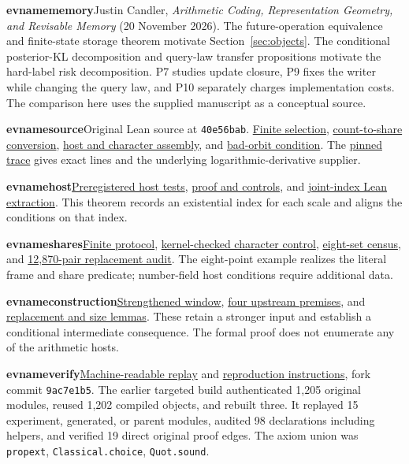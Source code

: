 \documentclass[11pt,letterpaper]{article}
\newcommand{\evitem}[2]{\par\medskip\noindent\hypertarget{ev-#1}{\textsf{\bfseries\color{teal}\csname evname#1\endcsname}}\quad #2\par}
\newcommand{\prooflink}[2]{\href{https://github.com/nousentllc/riemann-hypothesis/blob/9ac7e1b546b132edde02709e1c0af1bfccd40755/research/uriel/experiments/retained-host/#1}{#2}}
\newcommand{\origlink}[2]{\href{https://github.com/nousentllc/riemann-hypothesis/blob/40e56bab026552e089d7afcfeff08d2defb9c005/src/#1}{#2}}
\begin{document}
\evitem{memory}{Justin Candler, \emph{Arithmetic Coding, Representation Geometry, and Revisable Memory} (20 November 2026). The future-operation equivalence and finite-state storage theorem motivate Section~\ref{sec:objects}. The conditional posterior-KL decomposition and query-law transfer propositions motivate the hard-label risk decomposition. P7 studies update closure, P9 fixes the writer while changing the query law, and P10 separately charges implementation costs. The comparison here uses the supplied manuscript as a conceptual source.}
\evitem{source}{Original Lean source at \texttt{40e56bab}. \origlink{Development/AutomorphicArithmetic/ThickFrames/select.lean}{Finite selection}, \origlink{Development/AutomorphicArithmetic/ThickFrames/topsGroup.lean}{count-to-share conversion}, \origlink{Development/AutomorphicArithmetic/ShortNorms/supplyOfAdmOf.lean}{host and character assembly}, and \origlink{Development/AbelianVarietyTheory/Definitions/GlobalTwisting/ThinScalesIffHostBound.lean}{bad-orbit condition}. The \prooflink{SOURCE.md}{pinned trace} gives exact lines and the underlying logarithmic-derivative supplier.}
\evitem{host}{\prooflink{PROTOCOL.md}{Preregistered host tests}, \prooflink{HOST.md}{proof and controls}, and \prooflink{HostHandoff.lean}{joint-index Lean extraction}. This theorem records an existential index for each scale and aligns the conditions on that index.}
\evitem{shares}{\prooflink{SHARES_PROTOCOL.md}{Finite protocol}, \prooflink{ShareControl.lean}{kernel-checked character control}, \prooflink{share_counts.json}{eight-set census}, and \prooflink{results/margin_counts.json}{12,870-pair replacement audit}. The eight-point example realizes the literal frame and share predicate; number-field host conditions require additional data.}
\evitem{construction}{\prooflink{StrongWindow.lean}{Strengthened window}, \prooflink{Construction.lean}{four upstream premises}, and \prooflink{ShareMargin.lean}{replacement and size lemmas}. These retain a stronger input and establish a conditional intermediate consequence. The formal proof does not enumerate any of the arithmetic hosts.}
\evitem{verify}{\prooflink{results/verification.json}{Machine-readable replay} and \prooflink{REPRODUCE.md}{reproduction instructions}, fork commit \texttt{9ac7e1b5}. The earlier targeted build authenticated 1,205 original modules, reused 1,202 compiled objects, and rebuilt three. It replayed 15 experiment, generated, or parent modules, audited 98 declarations including helpers, and verified 19 direct original proof edges. The axiom union was \texttt{propext}, \texttt{Classical.choice}, \texttt{Quot.sound}.}
\end{document}
